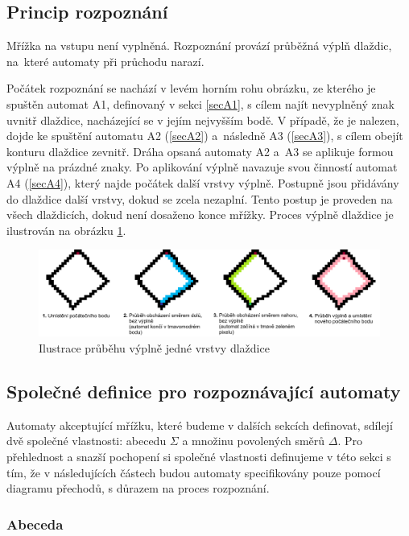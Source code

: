 \subsection*{Princip rozpoznání}

Mřížka na vstupu není vyplněná. Rozpoznání provází průběžná výplň dlaždic, na~které automaty při průchodu narazí.

Počátek rozpoznání se nachází v levém horním rohu obrázku, ze kterého je spuštěn automat A1, definovaný v sekci \ref{secA1}, s cílem najít nevyplněný znak uvnitř dlaždice, nacházející se v jejím nejvyšším bodě. V případě, že je nalezen, dojde ke spuštění automatu A2 (\ref{secA2}) a~následně A3 (\ref{secA3}), s cílem obejít konturu dlaždice zevnitř. Dráha opsaná automaty A2 a~A3 se aplikuje formou výplně na prázdné znaky. Po aplikování výplně navazuje svou činností automat A4 (\ref{secA4}), který najde počátek další vrstvy výplně. Postupně jsou přidávány do dlaždice další vrstvy, dokud se zcela nezaplní. Tento postup je proveden na všech dlaždicích, dokud není dosaženo konce mřížky. Proces výplně dlaždice je ilustrován na obrázku \ref{fig:prubehVyplnePOpis}.

\begin{figure}[H]
    \centering
    \includegraphics[width=\textwidth]{obrazky-figures/prubehVyplnePopis.png}
    \caption{Ilustrace průběhu výplně jedné vrstvy dlaždice}
    \label{fig:prubehVyplnePOpis}
\end{figure}

\subsection*{Společné definice pro rozpoznávající automaty}

Automaty akceptující mřížku, které budeme v dalších sekcích definovat, sdílejí dvě společné vlastnosti: abecedu $\Sigma$ a množinu povolených směrů $\Delta$. Pro přehlednost a snazší pochopení si společné vlastnosti definujeme v této sekci s tím, že v následujících částech budou automaty specifikovány pouze pomocí diagramu přechodů, s důrazem na proces rozpoznání.

\subsubsection*{Abeceda}


